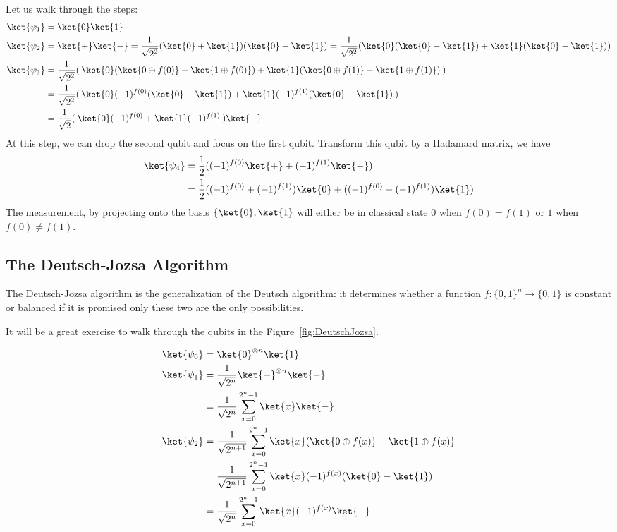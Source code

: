 Let us walk through the steps: 
\begin{align*}
    \ket{\psi_1} &= \ket{0}\ket{1} \\
    \ket{\psi_2} &= \ket{+}\ket{-} = \frac{1}{\sqrt{2^2}}(\ket{0} + \ket{1})(\ket{0} - \ket{1}) = \frac{1}{\sqrt{2^2}}(\ket{0}(\ket{0} - \ket{1}) + \ket{1}(\ket{0} - \ket{1}))\\
    \ket{\psi_3} &= \frac{1}{\sqrt{2^2}}(\: \ket{0}(\ket{0\oplus f(0)} - \ket{1\oplus f(0)}) + \ket{1}(\ket{0\oplus f(1)} - \ket{1\oplus f(1)}) \:) \\
           &= \frac{1}{\sqrt{2^2}}(\:\ket{0}(-1)^{f(0)}(\ket{0} - \ket{1}) + \ket{1}(-1)^{f(1)}(\ket{0} - \ket{1})\:) \\
           &= \frac{1}{\sqrt{2}}(\:\ket{0}(-1)^{f(0)} + \ket{1}(-1)^{f(1)}\:) \ket{-} \\    
\end{align*}
At this step, we can drop the second qubit and focus on the first qubit. Transform this qubit by a Hadamard matrix, we have
\begin{align*}
 \ket{\psi_4} &= \frac{1}{2} ((-1)^{f(0)} \ket{+} + (-1)^{f(1)} \ket{-}) \\
        &= \frac{1}{2} ( (-1)^{f(0)} +
(-1)^{f(1)})\ket{0} +  ((-1)^{f(0)} -
(-1)^{f(1)})\ket{1} ) \\  
\end{align*}
The measurement, by projecting onto the basis \(\{\ket{0}, \ket{1}\) will either be in classical state \(0\) when \(f(0) = f(1)\)  or \(1\) when \(f(0) \neq f(1).\) 
 
\subsection{The Deutsch-Jozsa Algorithm}
The Deutsch-Jozsa algorithm is the generalization of the Deutsch algorithm: it determines whether a function \(f: \{0,1\}^n \rightarrow \{0,1\}\) is constant or balanced if it is promised only these two are the only possibilities. 

It will be a great exercise to walk through the qubits in the Figure~\ref{fig:DeutschJozsa}. 

\begin{align*}
    \ket{\psi_0} &= \ket{0}^{\otimes n}\ket{1} \\
    \ket{\psi_1} &= \frac{1}{\sqrt{2^n}}\ket{+}^{\otimes n}\ket{-} \\
           &= \frac{1}{\sqrt{2^n}} \sum_{x=0}^{2^n-1} \ket{x}\ket{-} \\
    \ket{\psi_2} &= \frac{1}{\sqrt{2^{n+1}}}\sum_{x=0}^{2^n-1}\ket{x} (\ket{0\oplus f(x)} - \ket{1\oplus f(x)} \\
           &= \frac{1}{\sqrt{2^{n+1}}}\sum_{x=0}^{2^n-1}\ket{x}(-1)^{f(x)} (\ket{0} - \ket{1}) \\
           &= \frac{1}{\sqrt{2^{n}}}\sum_{x=0}^{2^n-1}\ket{x}(-1)^{f(x)} \ket{-} \\ 
\end{align*}

